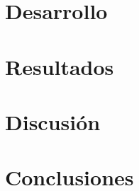\documentclass[10pt,a4paper]{article}
\begin{document}
\section{Desarrollo}

\newpage

%

\section{Resultados}

\newpage


\section{Discusión}

\newpage

\section{Conclusiones}

\newpage
\end{document}
